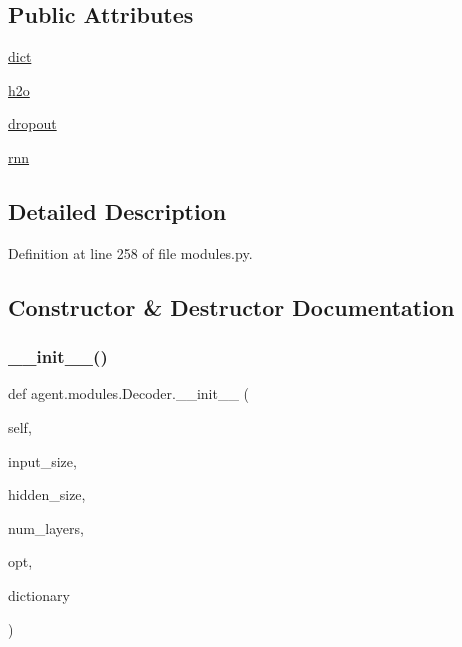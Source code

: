 \subsection*{Public Attributes}
\begin{DoxyCompactItemize}
\item 
\hyperlink{classagent_1_1modules_1_1Decoder_afa32bb09dc45397ab9ec963a6dd54cb7}{dict}
\item 
\hyperlink{classagent_1_1modules_1_1Decoder_acb96c900ec5ab64a366846e9e88ba7e8}{h2o}
\item 
\hyperlink{classagent_1_1modules_1_1Decoder_a9924bcfb8e8bd2c76f9d359d55df8c6b}{dropout}
\item 
\hyperlink{classagent_1_1modules_1_1Decoder_af53b07597d0aef5d51ac58af511fe053}{rnn}
\end{DoxyCompactItemize}


\subsection{Detailed Description}


Definition at line 258 of file modules.\+py.



\subsection{Constructor \& Destructor Documentation}
\mbox{\label{classagent_1_1modules_1_1Decoder_ac77f95c38737d146d1f92c45d2de59dc}} 
\subsubsection{\texorpdfstring{\+\_\+\+\_\+init\+\_\+\+\_\+()}{\_\_init\_\_()}}
{\footnotesize\ttfamily def agent.\+modules.\+Decoder.\+\_\+\+\_\+init\+\_\+\+\_\+ (\begin{DoxyParamCaption}\item[{}]{self,  }\item[{}]{input\+\_\+size,  }\item[{}]{hidden\+\_\+size,  }\item[{}]{num\+\_\+layers,  }\item[{}]{opt,  }\item[{}]{dictionary }\end{DoxyParamCaption})}



